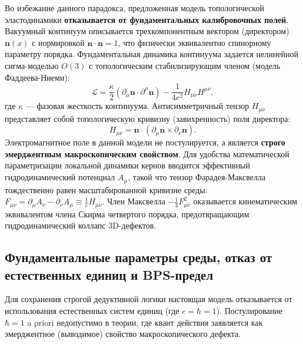 \documentclass[11pt,a4paper]{article}
\begin{document}
	Во избежание данного парадокса, предложенная модель топологической эластодинамики \textbf{отказывается от фундаментальных калибровочных полей}. Вакуумный континуум описывается трехкомпонентным вектором (директором) $\mathbf{n}(x)$ с нормировкой $\mathbf{n} \cdot \mathbf{n} = 1$, что физически эквивалентно спинорному параметру порядка. 
	Фундаментальная динамика континуума задается нелинейной сигма-моделью $O(3)$ с топологическим стабилизирующим членом (модель Фаддеева-Ниеми):
	\begin{equation}
		\mathcal{L} = \frac{\kappa}{2} (\partial_\mu \mathbf{n} \cdot \partial^\mu \mathbf{n}) - \frac{1}{4e^2} H_{\mu\nu} H^{\mu\nu},
	\end{equation}
	где $\kappa$ — фазовая жесткость континуума. Антисимметричный тензор $H_{\mu\nu}$ представляет собой топологическую кривизну (завихренность) поля директора:
	\begin{equation}
		H_{\mu\nu} = \mathbf{n} \cdot (\partial_\mu \mathbf{n} \times \partial_\nu \mathbf{n}).
	\end{equation}
	Электромагнитное поле в данной модели не постулируется, а является \textbf{строго эмерджентным макроскопическим свойством}. Для удобства математической параметризации локальной динамики кернов вводится эффективный гидродинамический потенциал $A_\mu$, такой что тензор Фарадея-Максвелла тождественно равен масштабированной кривизне среды: $F_{\mu\nu} = \partial_\mu A_\nu - \partial_\nu A_\mu \equiv \frac{1}{e} H_{\mu\nu}$. Член Максвелла $-\frac{1}{4}F_{\mu\nu}^2$ оказывается кинематическим эквивалентом члена Скирма четвертого порядка, предотвращающим гидродинамический коллапс 3D-дефектов.
	
	\subsection{Фундаментальные параметры среды, отказ от естественных единиц и BPS-предел}
	Для сохранения строгой дедуктивной логики настоящая модель отказывается от использования естественных систем единиц (где $c = \hbar = 1$). Постулирование $\hbar=1$ a priori недопустимо в теории, где квант действия заявляется как эмерджентное (выводимое) свойство макроскопического дефекта.
	
\end{document}
